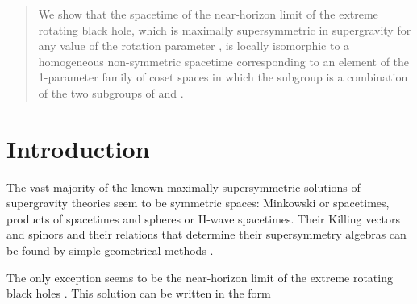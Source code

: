 \documentclass[12pt,a4paper]{article}
\begin{document}
\begin{quotation}

\small

We show that the spacetime of the near-horizon limit of the extreme
rotating \coordHE{} black hole, which is maximally supersymmetric in
\coordHE{} supergravity for any value of the rotation parameter \coordHE{}, is locally isomorphic to a homogeneous non-symmetric
spacetime corresponding to an element of the 1-parameter family of
coset spaces \coordHE{} in which the
subgroup \coordHE{} is a combination of the two \coordHE{} subgroups of
\coordHE{} and \coordHE{}.

\end{quotation}

\newpage

\pagestyle{plain}



\section*{Introduction}

The vast majority of the known maximally supersymmetric solutions of
supergravity theories seem to be symmetric spaces: Minkowski or \coordHE{}
spacetimes, products of \coordHE{} spacetimes and spheres \coordHE{} or H\coordHE{}-wave spacetimes. Their Killing vectors and spinors and
their relations that determine their supersymmetry algebras can be
found by simple geometrical methods \cite{Alonso-Alberca:2002gh}.

The only exception seems to be the near-horizon limit of the extreme rotating
\coordHE{} black holes
\cite{Cvetic:1998xh,Gauntlett:1998fz,Gibbons:1999uv,Herdeiro:2000ap}.  This
solution can be written in the form \cite{Lozano-Tellechea:2002pn}
\end{document}
